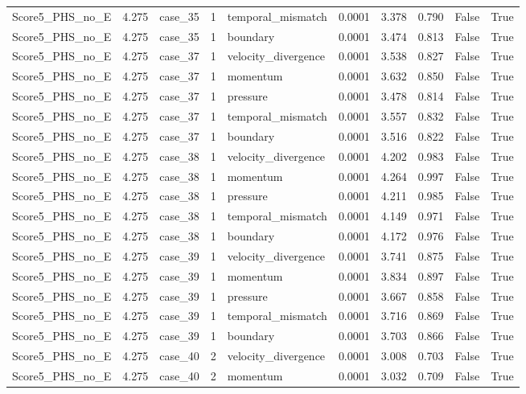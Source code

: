 \begin{longtable}{llllllllll}
Score5\_PHS\_no\_E & 4.275 & case\_35 & 1 & temporal\_mismatch & 0.0001 & 3.378 & 0.790 & False & True \\
Score5\_PHS\_no\_E & 4.275 & case\_35 & 1 & boundary & 0.0001 & 3.474 & 0.813 & False & True \\
Score5\_PHS\_no\_E & 4.275 & case\_37 & 1 & velocity\_divergence & 0.0001 & 3.538 & 0.827 & False & True \\
Score5\_PHS\_no\_E & 4.275 & case\_37 & 1 & momentum & 0.0001 & 3.632 & 0.850 & False & True \\
Score5\_PHS\_no\_E & 4.275 & case\_37 & 1 & pressure & 0.0001 & 3.478 & 0.814 & False & True \\
Score5\_PHS\_no\_E & 4.275 & case\_37 & 1 & temporal\_mismatch & 0.0001 & 3.557 & 0.832 & False & True \\
Score5\_PHS\_no\_E & 4.275 & case\_37 & 1 & boundary & 0.0001 & 3.516 & 0.822 & False & True \\
Score5\_PHS\_no\_E & 4.275 & case\_38 & 1 & velocity\_divergence & 0.0001 & 4.202 & 0.983 & False & True \\
Score5\_PHS\_no\_E & 4.275 & case\_38 & 1 & momentum & 0.0001 & 4.264 & 0.997 & False & True \\
Score5\_PHS\_no\_E & 4.275 & case\_38 & 1 & pressure & 0.0001 & 4.211 & 0.985 & False & True \\
Score5\_PHS\_no\_E & 4.275 & case\_38 & 1 & temporal\_mismatch & 0.0001 & 4.149 & 0.971 & False & True \\
Score5\_PHS\_no\_E & 4.275 & case\_38 & 1 & boundary & 0.0001 & 4.172 & 0.976 & False & True \\
Score5\_PHS\_no\_E & 4.275 & case\_39 & 1 & velocity\_divergence & 0.0001 & 3.741 & 0.875 & False & True \\
Score5\_PHS\_no\_E & 4.275 & case\_39 & 1 & momentum & 0.0001 & 3.834 & 0.897 & False & True \\
Score5\_PHS\_no\_E & 4.275 & case\_39 & 1 & pressure & 0.0001 & 3.667 & 0.858 & False & True \\
Score5\_PHS\_no\_E & 4.275 & case\_39 & 1 & temporal\_mismatch & 0.0001 & 3.716 & 0.869 & False & True \\
Score5\_PHS\_no\_E & 4.275 & case\_39 & 1 & boundary & 0.0001 & 3.703 & 0.866 & False & True \\
Score5\_PHS\_no\_E & 4.275 & case\_40 & 2 & velocity\_divergence & 0.0001 & 3.008 & 0.703 & False & True \\
Score5\_PHS\_no\_E & 4.275 & case\_40 & 2 & momentum & 0.0001 & 3.032 & 0.709 & False & True \\

\end{longtable}
